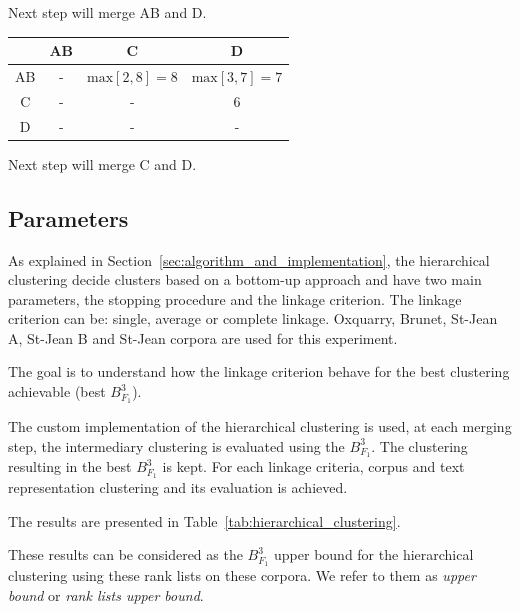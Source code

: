 \begin{example}
  \vspace{0.2cm}

  Next step will merge AB and D.

  \vspace{0.5cm}

  \begin{subexample}{\linewidth}
    \centering
    \begin{tabular}{c|c c c}
      \toprule
        & AB & C & D \\
      \midrule
      AB & - & $\text{max} \left[2, 8 \right] = 8$ & $\text{max} \left[3, 7 \right] = 7$ \\
      C  & - & - & 6 \\
      D  & - & - & - \\
      \bottomrule
    \end{tabular}
  \end{subexample}

  \vspace{0.2cm}

  Next step will merge C and D.
\end{example}


\subsection{Parameters\label{sec:hierarchical_clustering}}

As explained in Section~\ref{sec:algorithm_and_implementation}, the hierarchical clustering decide clusters based on a bottom-up approach and have two main parameters, the stopping procedure and the linkage criterion.
The linkage criterion can be: single, average or complete linkage.
Oxquarry, Brunet, St-Jean A, St-Jean B and St-Jean corpora are used for this experiment.

The goal is to understand how the linkage criterion behave for the best clustering achievable (best $B^3_{F_1}$).

The custom implementation of the hierarchical clustering is used, at each merging step, the intermediary clustering is evaluated using the $B^3_{F_1}$.
The clustering resulting in the best $B^3_{F_1}$ is kept.
For each linkage criteria, corpus and text representation clustering and its evaluation is achieved.

The results are presented in Table~\ref{tab:hierarchical_clustering}.

These results can be considered as the $B^3_{F_1}$ upper bound for the hierarchical clustering using these rank lists on these corpora.
We refer to them as \textit{upper bound} or \textit{rank lists upper bound}.

